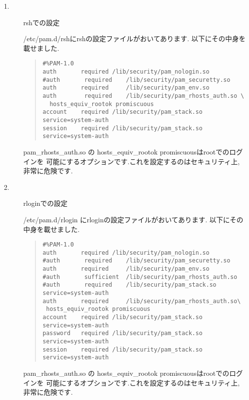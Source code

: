 \documentclass[a4paper,titlepage]{jreport}
\begin{document}
\begin{description}
\item[1.] rshでの設定

/etc/pam.d/rshにrshの設定ファイルがおいてあります. 以下にその中身を載せました.

\newpage

\begin{quote}
\begin{screen}
\begin{verbatim}
#%PAM-1.0
auth       required	/lib/security/pam_nologin.so
#auth       required	/lib/security/pam_securetty.so
auth       required     /lib/security/pam_env.so
auth        required    /lib/security/pam_rhosts_auth.so \
  hosts_equiv_rootok promiscuous
account    required	/lib/security/pam_stack.so service=system-auth
session    required	/lib/security/pam_stack.so service=system-auth
\end{verbatim}
\end{screen}
\end{quote}

pam\_rhosts\_auth.so の hosts\_equiv\_rootok promiscuousはrootでのログインを
可能にするオプションです.これを設定するのはセキュリティ上, 非常に危険です.

\item[2.] rloginでの設定

/etc/pam.d/rlogin にrloginの設定ファイルがおいてあります. 以下にその
中身を載せました.

\begin{quote}
\begin{screen}
\begin{verbatim}
#%PAM-1.0
auth       required	/lib/security/pam_nologin.so
#auth       required	/lib/security/pam_securetty.so
auth       required     /lib/security/pam_env.so
#auth       sufficient	/lib/security/pam_rhosts_auth.so
#auth       required	/lib/security/pam_stack.so service=system-auth
auth       required     /lib/security/pam_rhosts_auth.so\
 hosts_equiv_rootok promiscuous
account    required	/lib/security/pam_stack.so service=system-auth
password   required	/lib/security/pam_stack.so service=system-auth
session    required	/lib/security/pam_stack.so service=system-auth
\end{verbatim}
\end{screen}
\end{quote}

pam\_rhosts\_auth.so の hosts\_equiv\_rootok promiscuousはrootでのログインを
可能にするオプションです.これを設定するのはセキュリティ上, 非常に危険です.

\end{description}
\end{document}
